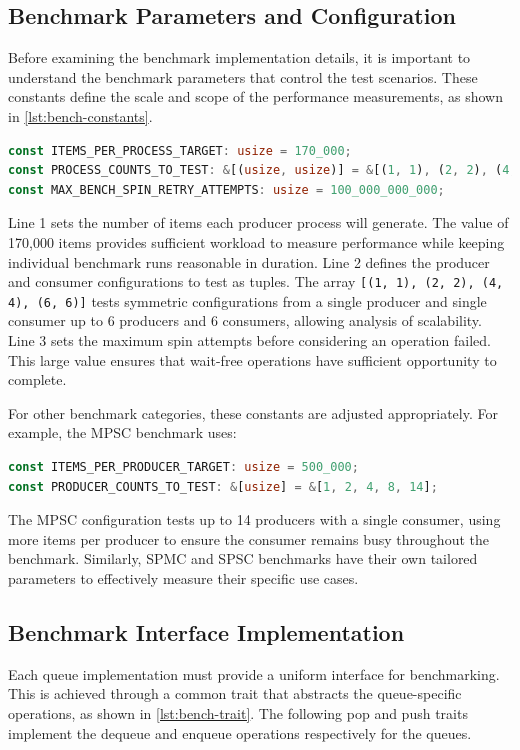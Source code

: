 \subsection{Benchmark Parameters and Configuration}
Before examining the benchmark implementation details, it is important to understand the benchmark parameters that control the test scenarios. These constants define the scale and scope of the performance measurements, as shown in \cref{lst:bench-constants}.

\begin{lstlisting}[language=Rust, style=boxed, caption={Benchmark configuration constants}, label={lst:bench-constants}]
const ITEMS_PER_PROCESS_TARGET: usize = 170_000;
const PROCESS_COUNTS_TO_TEST: &[(usize, usize)] = &[(1, 1), (2, 2), (4, 4), (6, 6)];
const MAX_BENCH_SPIN_RETRY_ATTEMPTS: usize = 100_000_000_000;
\end{lstlisting}

Line 1 sets the number of items each producer process will generate. The value of 170,000 items provides sufficient workload to measure performance while keeping individual benchmark runs reasonable in duration. Line 2 defines the producer and consumer configurations to test as tuples. The array \texttt{[(1, 1), (2, 2), (4, 4), (6, 6)]} tests symmetric configurations from a single producer and single consumer up to 6 producers and 6 consumers, allowing analysis of scalability. Line 3 sets the maximum spin attempts before considering an operation failed. This large value ensures that wait-free operations have sufficient opportunity to complete.

For other benchmark categories, these constants are adjusted appropriately. For example, the \ac{MPSC} benchmark uses:

\begin{lstlisting}[language=Rust, style=boxed, caption={MPSC-specific configuration}, label={lst:mpsc-constants}]
const ITEMS_PER_PRODUCER_TARGET: usize = 500_000;
const PRODUCER_COUNTS_TO_TEST: &[usize] = &[1, 2, 4, 8, 14];
\end{lstlisting}

The \ac{MPSC} configuration tests up to 14 producers with a single consumer, using more items per producer to ensure the consumer remains busy throughout the benchmark. Similarly, \ac{SPMC} and \ac{SPSC} benchmarks have their own tailored parameters to effectively measure their specific use cases.

\subsection{Benchmark Interface Implementation}
Each queue implementation must provide a uniform interface for benchmarking. This is achieved through a common trait that abstracts the queue-specific operations, as shown in \cref{lst:bench-trait}. The following pop and push traits implement the dequeue and enqueue operations respectively for the queues.

